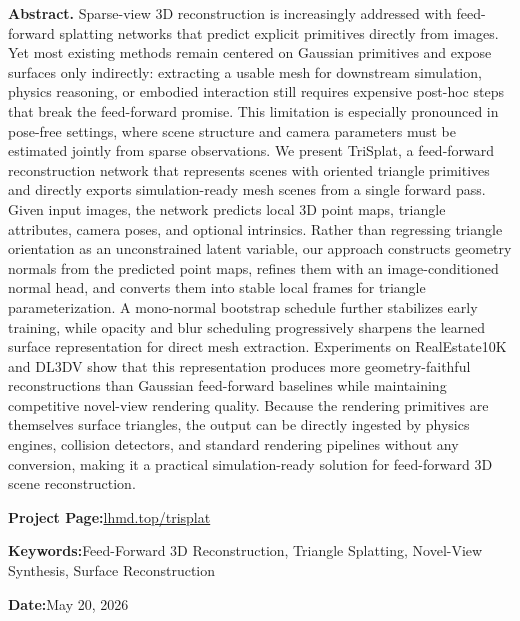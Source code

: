 \documentclass{llmxive}
\providecommand{\method}{TriSplat\xspace}
\providecommand{\trkeywords}{Feed-Forward 3D Reconstruction, Triangle Splatting, Novel-View Synthesis, Surface Reconstruction}
\providecommand{\ziplabmetalabel}[1]{{\ziplabsans\small\bfseries #1:}\hspace{0.35em}}
\begin{document}
\vspace{0.9em}
\begin{ziplabtitlebox}



\nohyphens

\footnotesize


\textbf{Abstract.}
Sparse-view 3D reconstruction is increasingly addressed with feed-forward splatting networks that predict explicit primitives directly from images. Yet most existing methods remain centered on Gaussian primitives and expose surfaces only indirectly: extracting a usable mesh for downstream simulation, physics reasoning, or embodied interaction still requires expensive post-hoc steps that break the feed-forward promise. This limitation is especially pronounced in pose-free settings, where scene structure and camera parameters must be estimated jointly from sparse observations. We present \method, a feed-forward reconstruction network that represents scenes with oriented triangle primitives and directly exports simulation-ready mesh scenes from a single forward pass. Given input images, the network predicts local 3D point maps, triangle attributes, camera poses, and optional intrinsics. Rather than regressing triangle orientation as an unconstrained latent variable, our approach constructs geometry normals from the predicted point maps, refines them with an image-conditioned normal head, and converts them into stable local frames for triangle parameterization. A mono-normal bootstrap schedule further stabilizes early training, while opacity and blur scheduling progressively sharpens the learned surface representation for direct mesh extraction. Experiments on RealEstate10K and DL3DV show that this representation produces more geometry-faithful reconstructions than Gaussian feed-forward baselines while maintaining competitive novel-view rendering quality. Because the rendering primitives are themselves surface triangles, the output can be directly ingested by physics engines, collision detectors, and standard rendering pipelines without any conversion, making it a practical simulation-ready solution for feed-forward 3D scene reconstruction.

{\footnotesize
{\ziplabmetalabel{Project Page}\href{https://lhmd.top/trisplat}{lhmd.top/trisplat}\par}
{\ziplabmetalabel{Keywords}\trkeywords\par}
{\ziplabmetalabel{Date}May 20, 2026\par}
}
\end{ziplabtitlebox}
\end{document}
